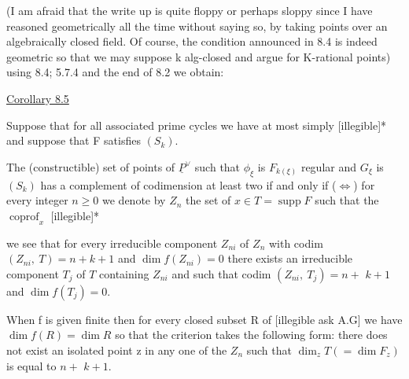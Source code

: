 
(I am afraid that the write up is quite floppy or perhaps
sloppy since I have reasoned geometrically all the time without
saying so, by taking points over an algebraically closed field.
Of course, the condition announced in 8.4 is indeed geometric so
that we may suppose k alg-closed and argue for K-rational points)
using 8.4; 5.7.4 and the end of 8.2 we obtain:

\uline{Corollary 8.5}

Suppose that for all associated prime cycles we have at most
simply [illegible]* and suppose that F satisfies $(S_k)$.

The (constructible) set of points of $\underline{P}^{\vee}$ such that $\phi_\xi$ is $F_{k(\xi)}$
regular and $G_\xi$ is $(S_k)$ has a complement of codimension at least two
if and only if ($\Leftrightarrow$) for every integer $n \geq 0$ we denote by $Z_n$ the set
of $x \in T = \operatorname{supp} F$ such that the $\operatorname{coprof}_x$ [illegible]*


we see that for every irreducible component $Z_{ni}$ of $Z_n$ with codim
$(Z_{ni},\ T) = n + k + 1$ and $\dim f(Z_{ni}) = 0$ there exists an irreducible
component $T_j$ of $T$ containing $Z_{ni}$ and such that codim $(Z_{ni},\ T_j) = n +$
$k + 1$ and $\dim f(T_j) = 0$.

When f is given finite then for every closed subset R of
[illegible ask A.G] we have $\dim f(R) = \dim R$ so that the criterion
takes the following form: there does not exist an isolated point
z in any one of the $Z_n$ such that $\dim_z T( = \dim F_z)$ is equal to $n +$
$k + 1$.

